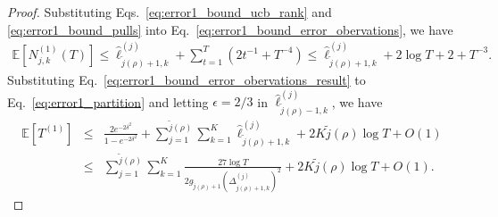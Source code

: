 \begin{proof}
Substituting Eqs.~\eqref{eq:error1_bound_ucb_rank} and \eqref{eq:error1_bound_pulls} into Eq.~\eqref{eq:error1_bound_error_obervations}, we have
\begin{eqnarray}\label{eq:error1_bound_error_obervations_result}
\mathbb{E}[N^{(1)}_{j,k}(T)]\leq  \hat{\ell}^{(j)}_{\tilde{j}(\rho)+1,k} + \sum_{t=1}^T (2 t^{-1} + T^{-4}) \leq \hat{\ell}^{(j)}_{\tilde{j}(\rho)+1,k} + 2\log T + 2 + T^{-3}.
\end{eqnarray}
Substituting Eq.~\eqref{eq:error1_bound_error_obervations_result} to  Eq.~\eqref{eq:error1_partition} and letting $\epsilon = 2/3$ in $\hat{\ell}^{(j)}_{\tilde{j}(\rho)-1,k}$, we have
\begin{eqnarray}
\mathbb{E}[T^{(1)}]
&\leq& \frac{2e^{-2\delta^2}}{1 - e^{-2\delta^2}} + \sum_{j =1}^{\tilde{j}(\rho)}\sum_{k=1}^K\hat{\ell}^{(j)}_{\tilde{j}(\rho)+1,k} + 2K\tilde{j}(\rho)\log T + O(1) \nonumber \\
&\leq&\sum_{j = 1}^{\tilde{j}(\rho)}\sum_{k=1}^K\frac{27\log T}{2g_{\tilde{j}(\rho)+1} (\Delta^{(j)}_{\tilde{j}(\rho)+1,k})^2} + 2K\tilde{j}(\rho)\log T + O(1).
\end{eqnarray}

\end{proof}

